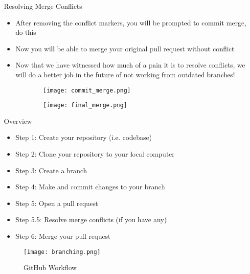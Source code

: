 \documentclass{beamer}
\begin{document}
\begin{frame}{Resolving Merge Conflicts}
\begin{itemize}
    \item After removing the conflict markers, you will be prompted to commit merge, do this
    \item Now you will be able to merge your original pull request without conflict
    \item Now that we have witnessed how much of a pain it is to resolve conflicts, we will do a better job in the future of not working from outdated branches!
\end{itemize}
\begin{figure}
\centering
\begin{subfigure}{\textwidth}
  \centering
  \texttt{[image: commit\_merge.png]}
\end{subfigure}%
\hspace{1cm}
\begin{subfigure}{\textwidth}
  \centering
  \texttt{[image: final\_merge.png]}
\end{subfigure}
\end{figure}
\end{frame}

\begin{frame}{Overview}
\begin{itemize}
    \item Step 1: Create your repository (i.e. codebase)
    \item Step 2: Clone your repository to your local computer
    \item Step 3: Create a branch
    \item Step 4: Make and commit changes to your branch
    \item Step 5: Open a pull request
    \item Step 5.5: Resolve merge conflicts (if you have any)
    \item Step 6: Merge your pull request
\end{itemize}
\begin{figure}
\texttt{[image: branching.png]}
\caption{\label{fig:your-figure}GitHub Workflow}
\end{figure}
\end{frame}
\end{document}
